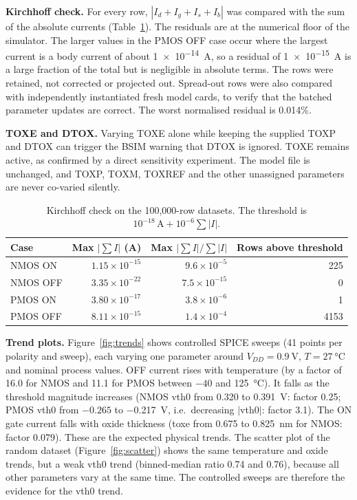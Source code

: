 \textbf{Kirchhoff check.} For every row, $|I_d+I_g+I_s+I_b|$ was compared with the sum of the absolute currents (Table~\ref{tab:kcl}). The residuals are at the numerical floor of the simulator. The larger values in the PMOS OFF case occur where the largest current is a body current of about \SI{1e-14}{\ampere}, so a residual of \SI{1e-15}{\ampere} is a large fraction of the total but is negligible in absolute terms. The rows were retained, not corrected or projected out. Spread-out rows were also compared with independently instantiated fresh model cards, to verify that the batched parameter updates are correct. The worst normalised residual is 0.014\%.

\textbf{TOXE and DTOX.} Varying TOXE alone while keeping the supplied TOXP and DTOX can trigger the BSIM warning that DTOX is ignored. TOXE remains active, as confirmed by a direct sensitivity experiment. The model file is unchanged, and TOXP, TOXM, TOXREF and the other unassigned parameters are never co-varied silently.

\begin{table}[H]
\centering\small
\caption{Kirchhoff check on the 100,000-row datasets. The threshold is $10^{-18}\,\mathrm{A}+10^{-6}\sum|I|$.}
\label{tab:kcl}
\begin{tabular}{lrrr}
\toprule
Case & Max $|\sum I|$ (A) & Max $|\sum I|/\sum|I|$ & Rows above threshold \\
\midrule
NMOS ON & $1.15\times10^{-15}$ & $9.6\times10^{-5}$ & 225 \\
NMOS OFF & $3.35\times10^{-22}$ & $7.5\times10^{-15}$ & 0 \\
PMOS ON & $3.80\times10^{-17}$ & $3.8\times10^{-6}$ & 1 \\
PMOS OFF & $8.11\times10^{-15}$ & $1.4\times10^{-4}$ & 4153 \\
\bottomrule
\end{tabular}
\end{table}

\textbf{Trend plots.} Figure~\ref{fig:trends} shows controlled SPICE sweeps (41 points per polarity and sweep), each varying one parameter around $V_{DD}=\SI{0.9}{\volt}$, $T=\SI{27}{\celsius}$ and nominal process values. OFF current rises with temperature (by a factor of 16.0 for NMOS and 11.1 for PMOS between $-40$ and \SI{125}{\celsius}). It falls as the threshold magnitude increases (NMOS vth0 from 0.320 to \SI{0.391}{\volt}: factor 0.25; PMOS vth0 from $-0.265$ to \SI{-0.217}{\volt}, i.e.\ decreasing $|$vth0$|$: factor 3.1). The ON gate current falls with oxide thickness (toxe from 0.675 to \SI{0.825}{\nano\meter} for NMOS: factor 0.079). These are the expected physical trends. The scatter plot of the random dataset (Figure~\ref{fig:scatter}) shows the same temperature and oxide trends, but a weak vth0 trend (binned-median ratio 0.74 and 0.76), because all other parameters vary at the same time. The controlled sweeps are therefore the evidence for the vth0 trend.

